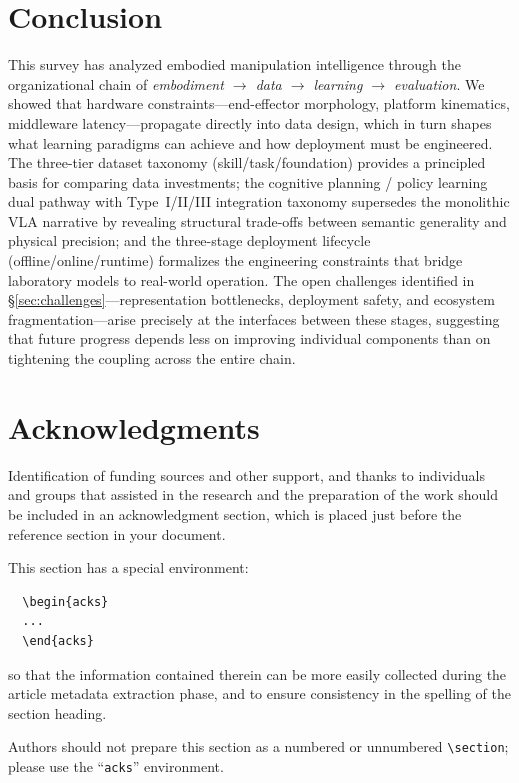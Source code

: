 \documentclass[acmsmall,screen,review,anonymous]{acmart}
\begin{document}
\section{Conclusion}

This survey has analyzed embodied manipulation intelligence through the organizational chain of \emph{embodiment $\to$ data $\to$ learning $\to$ evaluation}. We showed that hardware constraints---end-effector morphology, platform kinematics, middleware latency---propagate directly into data design, which in turn shapes what learning paradigms can achieve and how deployment must be engineered. The three-tier dataset taxonomy (skill/task/foundation) provides a principled basis for comparing data investments; the cognitive planning / policy learning dual pathway with Type~I/II/III integration taxonomy supersedes the monolithic VLA narrative by revealing structural trade-offs between semantic generality and physical precision; and the three-stage deployment lifecycle (offline/online/runtime) formalizes the engineering constraints that bridge laboratory models to real-world operation. The open challenges identified in \S\ref{sec:challenges}---representation bottlenecks, deployment safety, and ecosystem fragmentation---arise precisely at the interfaces between these stages, suggesting that future progress depends less on improving individual components than on tightening the coupling across the entire chain.

\section{Acknowledgments}

Identification of funding sources and other support, and thanks to
individuals and groups that assisted in the research and the
preparation of the work should be included in an acknowledgment
section, which is placed just before the reference section in your
document.

This section has a special environment:
\begin{verbatim}
  \begin{acks}
  ...
  \end{acks}
\end{verbatim}
so that the information contained therein can be more easily collected
during the article metadata extraction phase, and to ensure
consistency in the spelling of the section heading.

Authors should not prepare this section as a numbered or unnumbered {\verb|\section|}; please use the ``{\verb|acks|}'' environment.



\end{document}
